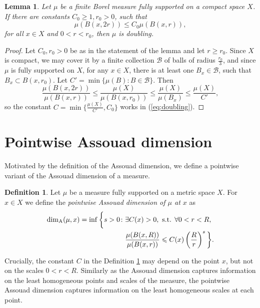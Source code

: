 \documentclass{PRM}
\theoremstyle{plain}
\newtheorem{lemma}[thm]{Lemma}
\theoremstyle{definition}
\newtheorem{defn}[thm]{Definition}
\theoremstyle{remark}
\begin{document}
\begin{lemma}\label{lemma:doubling_small_r}
Let $\mu$ be a finite Borel measure fully supported on a compact space $X$. If there are constants $C_0\geq 1,r_0>0$, such that
\begin{equation*}
    \mu(B(x,2r))\leq C_0\mu(B(x,r)),
\end{equation*}
for all $x\in X$ and $0<r<r_0$, then $\mu$ is doubling.
\end{lemma}
\begin{proof}
Let $C_0,r_0>0$ be as in the statement of the lemma and let $r\geq r_0$. Since $X$ is compact, we may cover it by a finite collection $\mathcal{B}$ of balls of radius $\frac{r_0}{3}$, and since $\mu$ is fully supported on $X$, for any $x\in X$, there is at least one $B_x\in\mathcal{B}$, such that $B_x\subset B(x,r_0)$. Let $C'=\min\{\mu(B)\colon B\in\mathcal{B}\}$. Then
\begin{equation*}
    \frac{\mu(B(x,2r))}{\mu(B(x,r))}\leq\frac{\mu(X)}{\mu(B(x,r_0))}\leq \frac{\mu(X)}{\mu(B_x)}\leq \frac{\mu(X)}{C'},
\end{equation*}
so the constant $C=\min\{\frac{\mu(X)}{C'},C_0\}$ works in (\ref{eq:doubling}).
\end{proof}

\section{Pointwise Assouad dimension}\label{sec:pw_assouad}
Motivated by the definition of the Assouad dimension, we define a pointwise variant of the Assouad dimension of a measure.

\begin{defn}\label{def:loc_assouad}
Let $\mu$ be a measure fully supported on a metric space $X$. For $x\in X$ we define the \emph{pointwise Assouad dimension of $\mu$ at $x$} as
\begin{align*}
    \dim_{\mathrm{A}}(\mu,x)=\inf\bigg\{s>0\colon &\exists C(x)>0,\textnormal{ s.t. }\forall0<r<R,\\
    &\frac{\mu(B(x,R))}{\mu(B(x,r))}\leq C(x)\left(\frac{R}{r}\right)^s\bigg\}.
\end{align*}
\end{defn}
Crucially, the constant $C$ in the Definition \ref{def:loc_assouad} may depend on the point $x$, but not on the scales $0<r<R$. Similarly as the Assouad dimension captures information on the least homogeneous points and scales of the measure, the pointwise Assouad dimension captures information on the least homogeneous scales at each point.
\end{document}
